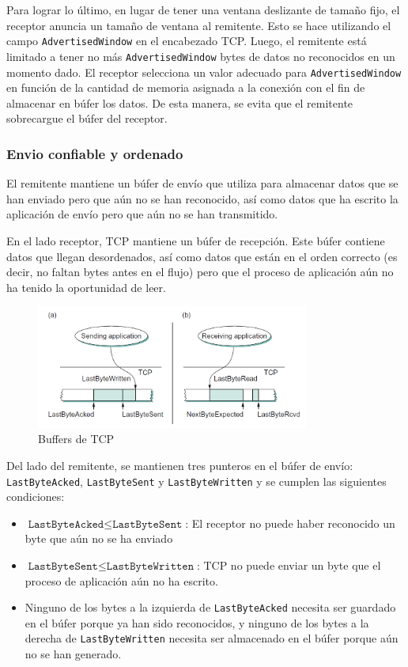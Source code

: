 Para lograr lo último, en lugar de tener una ventana deslizante de tamaño fijo, el receptor anuncia un tamaño de ventana al remitente. Esto se hace utilizando el campo \texttt{AdvertisedWindow} en el encabezado TCP. Luego, el remitente está limitado a tener no más \texttt{AdvertisedWindow} bytes de datos no reconocidos en un momento dado. El receptor selecciona un valor adecuado para \texttt{AdvertisedWindow} en función de la cantidad de memoria asignada a la conexión con el fin de almacenar en búfer los datos. De esta manera, se evita que el remitente sobrecargue el búfer del receptor.

\subsubsection*{Envio confiable y ordenado}
El remitente mantiene un búfer de envío que utiliza para almacenar datos que se han enviado pero que aún no se han reconocido, así como datos que ha escrito la aplicación de envío pero que aún no se han transmitido.

En el lado receptor, TCP mantiene un búfer de recepción. Este búfer contiene datos que llegan desordenados, así como datos que están en el orden correcto (es decir, no faltan bytes antes en el flujo) pero que el proceso de aplicación aún no ha tenido la oportunidad de leer.

\begin{figure}[H]
	\centering
	\includegraphics[width=0.8\textwidth
]{images/tcp-buffers.png}
	\caption[Buffers de TCP]{Buffers de TCP}
	\label{fig:tcp-buffers}
\end{figure}

Del lado del remitente, se mantienen tres punteros en el búfer de envío: \texttt{LastByteAcked}, \texttt{LastByteSent} y \texttt{LastByteWritten} y se cumplen las siguientes condiciones:
\begin{itemize}
  \item \(\texttt{LastByteAcked} \leq \texttt{LastByteSent}\): El receptor no puede haber reconocido un byte que aún no se ha enviado
  \item \(\texttt{LastByteSent} \leq \texttt{LastByteWritten}\): TCP no puede enviar un byte que el proceso de aplicación aún no ha escrito.
  \item Ninguno de los bytes a la izquierda de \texttt{LastByteAcked} necesita ser guardado en el búfer porque ya han sido reconocidos, y ninguno de los bytes a la derecha de \texttt{LastByteWritten} necesita ser almacenado en el búfer porque aún no se han generado.
\end{itemize}

